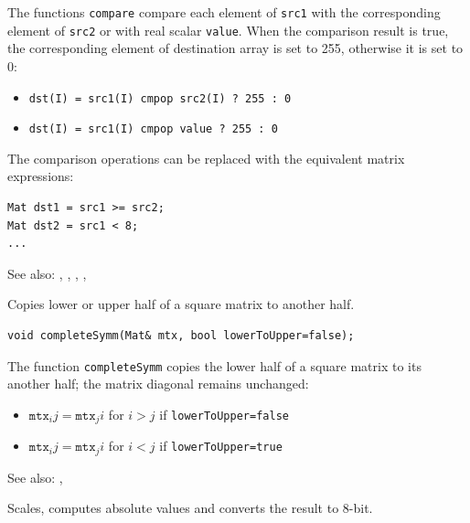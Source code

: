 The functions \texttt{compare} compare each element of \texttt{src1} with the corresponding element of \texttt{src2}
or with real scalar \texttt{value}. When the comparison result is true, the corresponding element of destination array is set to 255, otherwise it is set to 0:

\begin{itemize}
    \item \texttt{dst(I) = src1(I) cmpop src2(I) ? 255 : 0}
    \item \texttt{dst(I) = src1(I) cmpop value ? 255 : 0}
\end{itemize}

The comparison operations can be replaced with the equivalent matrix expressions:

\begin{lstlisting}
Mat dst1 = src1 >= src2;
Mat dst2 = src1 < 8;
...
\end{lstlisting}

See also: , , , , 

\label{completeSymm}
Copies lower or upper half of a square matrix to another half.

\begin{lstlisting}
void completeSymm(Mat& mtx, bool lowerToUpper=false);
\end{lstlisting}
\begin{description}
\end{description}

The function \texttt{completeSymm} copies the lower half of a square matrix to its another half; the matrix diagonal remains unchanged:

\begin{itemize}
    \item $\texttt{mtx}_ij=\texttt{mtx}_ji$ for $i > j$ if \texttt{lowerToUpper=false}
    \item $\texttt{mtx}_ij=\texttt{mtx}_ji$ for $i < j$ if \texttt{lowerToUpper=true}
\end{itemize}

See also: , 

\label{convertScaleAbs}
Scales, computes absolute values and converts the result to 8-bit.

